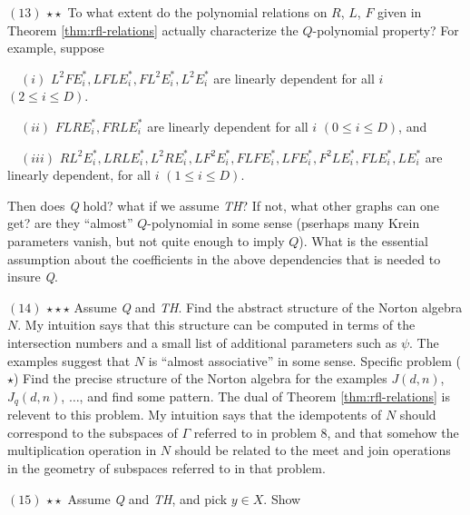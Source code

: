 \documentclass[
]{book}
\theoremstyle{definition}
\theoremstyle{definition}
\theoremstyle{definition}
\theoremstyle{definition}
\theoremstyle{remark}
\begin{document}
\hfill\break
\((13)\) \(\star\star\) To what extent do the polynomial relations on \(R\), \(L\), \(F\) given in Theorem \ref{thm:rfl-relations} actually characterize the \(Q\)-polynomial property? For example, suppose

\(\quad (i)\) \(L^2FE^*_i, LFLE^*_i, FL^2E^*_i, L^2E^*_i\) are linearly dependent for all \(i\) \((2\leq i\leq D)\).

\(\quad (ii)\) \(FLRE^*_i, FRLE^*_i\) are linearly dependent for all \(i\) \((0\leq i\leq D)\), and

\(\quad (iii)\) \(RL^2E^*_i, LRLE^*_i, L^2RE^*_i, LF^2E^*_i, FLFE^*_i, LFE^*_i, F^2LE^*_i, FLE^*_i, LE^*_i\) are linearly dependent, for all \(i\) \((1\leq i \leq D)\).

Then does \emph{Q} hold? what if we assume \emph{TH}? If not, what other graphs can one get? are they ``almost'' \(Q\)-polynomial in some sense (pserhaps many Krein parameters vanish, but not quite enough to imply \(Q\)). What is the essential assumption about the coefficients in the above dependencies that is needed to insure \emph{Q}.

\hfill\break
\((14)\) \(\star\star\)\(\star\) Assume \emph{Q} and \emph{TH}. Find the abstract structure of the Norton algebra \(N\). My intuition says that this structure can be computed in terms of the intersection numbers and a small list of additional parameters such as \(\psi\). The examples suggest that \(N\) is ``almost associative'' in some sense. Specific problem (\(\star\)) Find the precise structure of the Norton algebra for the examples \(J(d,n)\), \(J_q(d,n)\), \(\ldots\), and find some pattern. The dual of Theorem \ref{thm:rfl-relations} is relevent to this problem. My intuition says that the idempotents of \(N\) should correspond to the subspaces of \(\Gamma\) referred to in problem 8, and that somehow the multiplication operation in \(N\) should be related to the meet and join operations in the geometry of subspaces referred to in that problem.

\hfill\break
\((15)\) \(\star\star\) Assume \emph{Q} and \emph{TH}, and pick \(y\in X\). Show
\end{document}
